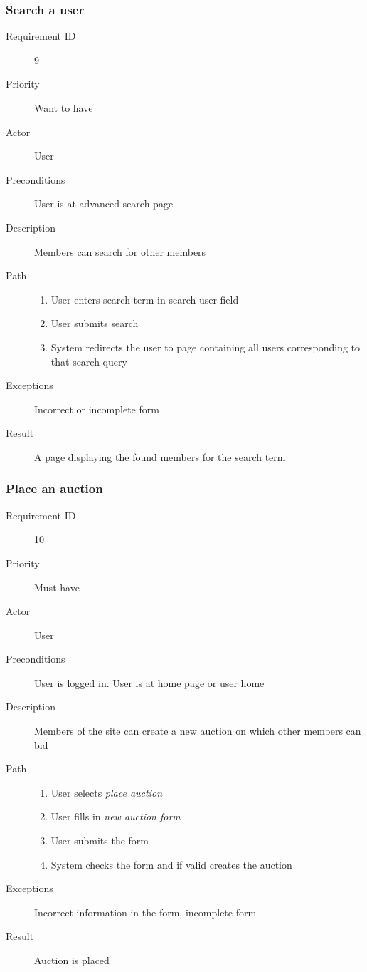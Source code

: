 		\subsubsection{Search a user}
			\begin{description}
				\item[Requirement ID] 9
				\item[Priority] Want to have
				\item[Actor] User
				\item[Preconditions] User is at advanced search page
				\item[Description] Members can search for other members 
				\item[Path]
 					\begin{enumerate}
						\item User enters search term in search user field
						\item User submits search
						\item System redirects the user to page containing all users corresponding to that search 
						query
					\end{enumerate}
				\item[Exceptions] Incorrect or incomplete form
				\item[Result] A page displaying the found members for the search term
			\end{description}
		\subsubsection{Place an auction}
			\begin{description}
				\item[Requirement ID] 10
				\item[Priority] Must have
				\item[Actor] User
				\item[Preconditions] User is logged in. User is at home page or user home
				\item[Description] Members of the site can create a new auction on which
				other members can bid
				\item[Path]
 					\begin{enumerate}
						\item User selects \emph{place auction}
						\item User fills in \emph{new auction form}
						\item User submits the form
						\item System checks the form and if valid creates the auction
					\end{enumerate}
				\item[Exceptions] Incorrect information in the form, incomplete form
				\item[Result] Auction is placed
			\end{description}
